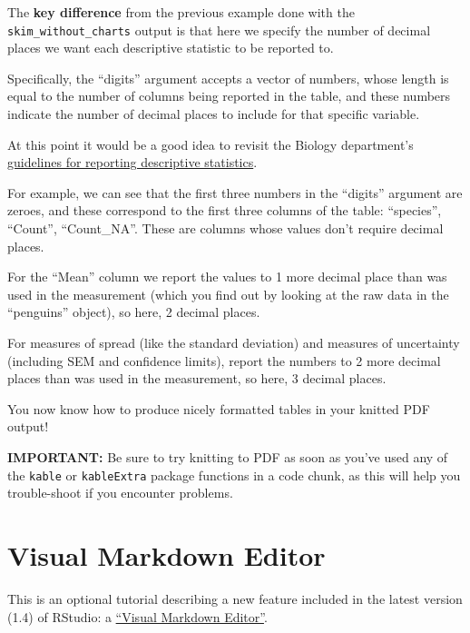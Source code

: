 \documentclass[
]{book}
\begin{document}
The \textbf{key difference} from the previous example done with the \texttt{skim\_without\_charts} output is that here we specify the number of decimal places we want each descriptive statistic to be reported to.

Specifically, the ``digits'' argument accepts a vector of numbers, whose length is equal to the number of columns being reported in the table, and these numbers indicate the number of decimal places to include for that specific variable.

At this point it would be a good idea to revisit the Biology department's \href{https://ubco-biology.github.io/Procedures-and-Guidelines/descriptive-summary-statistics.html}{guidelines for reporting descriptive statistics}.

For example, we can see that the first three numbers in the ``digits'' argument are zeroes, and these correspond to the first three columns of the table: ``species'', ``Count'', ``Count\_NA''. These are columns whose values don't require decimal places.

For the ``Mean'' column we report the values to 1 more decimal place than was used in the measurement (which you find out by looking at the raw data in the ``penguins'' object), so here, 2 decimal places.

For measures of spread (like the standard deviation) and measures of uncertainty (including SEM and confidence limits), report the numbers to 2 more decimal places than was used in the measurement, so here, 3 decimal places.

You now know how to produce nicely formatted tables in your knitted PDF output!

\textbf{IMPORTANT: }
Be sure to try knitting to PDF as soon as you've used any of the \texttt{kable} or \texttt{kableExtra} package functions in a code chunk, as this will help you trouble-shoot if you encounter problems.

\chapter*{Visual Markdown Editor}\label{visual-markdown-editor}

This is an optional tutorial describing a new feature included in the latest version (1.4) of RStudio: a \href{https://rstudio.github.io/visual-markdown-editing/?_ga=2.43936998.2146903537.1631712539-1654786890.1631712539}{``Visual Markdown Editor''}.
\end{document}
